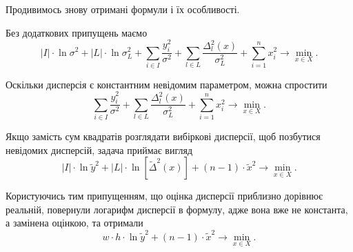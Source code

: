 Продивимось знову отримані формули і їх особливості.

Без додаткових припущень маємо
\begin{equation*}
  \left| I \right| \cdot \ln{\sigma^2}
  + \left| L \right| \cdot \ln{\sigma_L^2}
  + \sum_{i \in I} \frac{ y_i^2}{\sigma^2}
  + \sum_{l \in L} \frac{ \Delta_l^2\left( x \right)}{\sigma_L^2}
  + \sum_{i = 1}^n x_i^2
  \to \min\limits_{x \in X}.
\end{equation*}

Оскільки дисперсія є константним невідомим параметром,
можна спростити
\begin{equation*}
  \sum_{i \in I} \frac{ y_i^2}{\sigma^2}
  + \sum_{l \in L} \frac{ \Delta_l^2\left( x \right)}{\sigma_L^2}
  + \sum_{i = 1}^n x_i^2
  \to \min\limits_{x \in X}.
\end{equation*}

Якщо замість сум квадратів розглядати вибіркові дисперсії,
щоб позбутися невідомих дисперсій, задача приймає вигляд
\begin{equation*}
  \left| I \right|
  \cdot \ln{\widetilde{y}^2}
  + \left| L \right|
  \cdot \ln{\left[ \widetilde{\Delta}^2\left( x \right) \right]}
  + \left( n - 1 \right) \cdot \widetilde{x}^2
  \to \min\limits_{x \in X}.
\end{equation*}

Користуючись тим припущенням,
що оцінка дисперсії приблизно дорівнює реальній,
повернули логарифм дисперсії в формулу,
адже вона вже не константа, а замінена оцінкою, та отримали
\begin{equation*}
  w \cdot h \cdot \ln{\widetilde{y}^2}
  + \left( n - 1 \right) \cdot \widetilde{x}^2
  \to \min\limits_{x \in X}.
\end{equation*}

